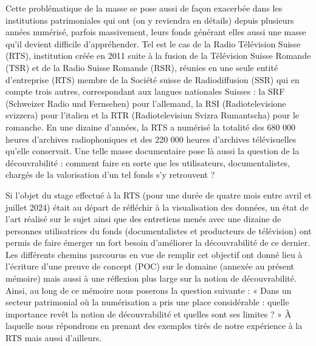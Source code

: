 \documentclass[a4paper,12pt,twoside]{book}
\begin{document}
	Cette problématique de la masse se pose aussi de façon exacerbée dans les institutions patrimoniales qui ont (on y reviendra en détails) depuis plusieurs années numérisé, parfois massivement, leurs fonds générant elles aussi une masse qu’il devient difficile d’appréhender. Tel est le cas de la Radio Télévision Suisse (RTS), institution créée en 2011 suite à la fusion de la Télévision Suisse Romande (TSR) et de la Radio Suisse Romande (RSR), réunies en une seule entité d’entreprise (RTS) membre de la Société suisse de Radiodiffusion (SSR) qui en compte trois autres, correspondant aux langues nationales Suisses : la SRF (Schweizer Radio und Fernsehen) pour l’allemand, la RSI (Radiotelevisione svizzera) pour l’italien et la RTR (Radiotelevisiun Svizra Rumantscha) pour le romanche. En une dizaine d’années, la RTS a numérisé la totalité des 680 000 heures d’archives radiophoniques et des 220 000 heures d’archives télévisuelles qu’elle conservait. Une telle masse documentaire pose là aussi la question de la découvrabilité : comment faire en sorte que les utilisateurs, documentalistes, chargés de la valorisation d’un tel fonds s'y retrouvent ? 
	
	Si l’objet du stage effectué à la RTS (pour une durée de quatre mois entre avril et juillet 2024) était au départ de réfléchir à la visualisation des données, un état de l’art réalisé sur le sujet ainsi que des entretiens menés avec une dizaine de personnes utilisatrices du fonds (documentalistes et producteurs de télévision) ont permis de faire émerger un fort besoin d’améliorer la découvrabilité de ce dernier. Les différents chemins parcourus en vue de remplir cet objectif ont donné lieu à l’écriture d’une preuve de concept (POC) sur le domaine (annexée au présent mémoire) mais aussi à une réflexion plus large sur la notion de découvrabilité. Ainsi, au long de ce mémoire nous poserons la question suivante : « Dans un secteur patrimonial où la numérisation a pris une place considérable : quelle importance revêt la notion de découvrabilité et quelles sont ses limites ? » À laquelle nous répondrons en prenant des exemples tirés de notre expérience à la RTS mais aussi d’ailleurs.
	
\end{document}

